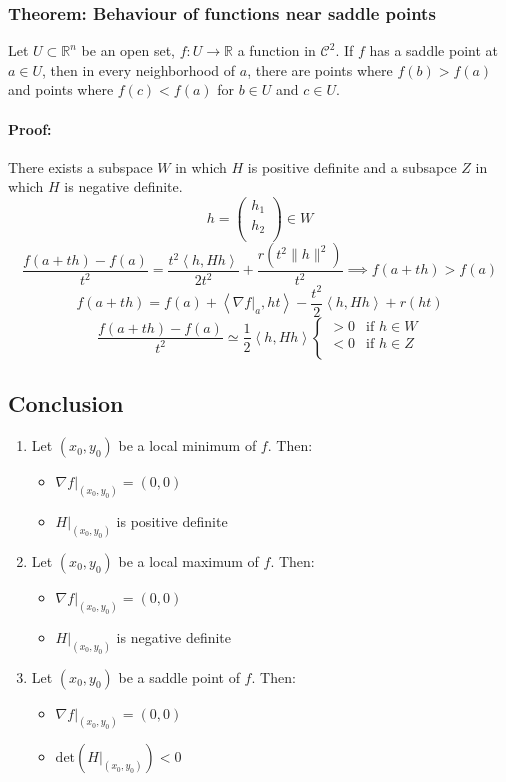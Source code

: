 \documentclass[11pt]{article}
\newcommand{\inner}[2]{\left\langle #1, #2 \right\rangle}
\begin{document}
\subsubsection{Theorem: Behaviour of functions near saddle points}
Let $U \subset \mathbb{R}^n$ be an open set, $f : U \rightarrow \mathbb{R}$ a function in $\mathcal{C}^2$. If $f$ has a saddle point at $a \in U$, then in every neighborhood of $a$, there are points where $f(b) > f(a)$ and points where $f(c) < f(a)$ for $b \in U$ and $c \in U$.
\paragraph{Proof:} There exists a subspace $W$ in which $H$ is positive definite and a subsapce $Z$ in which $H$ is negative definite.
\[
h = \begin{pmatrix}
    h_1 \\
    h_2 \\
\end{pmatrix} \in W
\]
\[
\frac{f(a + th) - f(a)}{t^2} = \frac{t^2 \inner{h}{Hh}}{2t^2} + \frac{r(t^2 \|h\|^2)}{t^2} \implies f(a + th) > f(a)
\]
\[
f(a + th) = f(a) + \inner{\nabla f\big|_a}{ht} - \frac{t^2}{2} \inner{h}{Hh} + r(ht)
\]
\[
\frac{f(a + th) - f(a)}{t^2} \simeq \frac{1}{2} \inner{h}{Hh} \begin{cases}
    > 0 & \text{if } h \in W \\
    < 0 & \text{if } h \in Z \\
\end{cases}
\]

\subsection{Conclusion}
\begin{enumerate}
    \item Let $(x_0,y_0)$ be a local minimum of $f$. Then:
    \begin{itemize}
        \item $\nabla f\big|_{(x_0,y_0)} = (0,0)$
        \item $H\big|_{(x_0,y_0)}$ is positive definite
    \end{itemize}
    \item Let $(x_0,y_0)$ be a local maximum of $f$. Then:
    \begin{itemize}
        \item $\nabla f\big|_{(x_0,y_0)} = (0,0)$
        \item $H\big|_{(x_0,y_0)}$ is negative definite
    \end{itemize}
    \item Let $(x_0,y_0)$ be a saddle point of $f$. Then:
    \begin{itemize}
        \item $\nabla f\big|_{(x_0,y_0)} = (0,0)$
        \item $\text{det}(H\big|_{(x_0,y_0)}) < 0$
    \end{itemize}
\end{enumerate}
\end{document}
